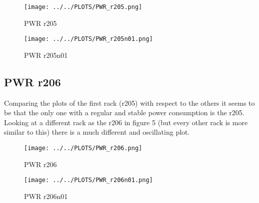 \vspace{-5pt}

\begin{figure}[H]
\centering
\texttt{[image: ../../PLOTS/PWR\_r205.png]}
\captionsetup{skip=-10pt}
\caption{PWR r205}
\label{fig:PWR_r205}
\end{figure}

\vspace{-5pt}

\begin{figure}[H]
\centering
\texttt{[image: ../../PLOTS/PWR\_r205n01.png]}
\captionsetup{skip=-10pt}
\caption{PWR r205n01}
\label{fig:PWR_r205n01}
\end{figure}
\clearpage

\subsection{PWR r206}
Comparing the plots of the first rack (r205) with respect to the others it seems to be that the only one with a regular and stable power consumption is the r205.\\ Looking at a different rack as the r206 in figure 5 (but every other rack is more similar to this) there is a much different and oscillating plot. 

\vspace{-12pt}

\begin{figure}[H]
\centering
\texttt{[image: ../../PLOTS/PWR\_r206.png]}
\captionsetup{skip=-10pt}
\caption{PWR r206}
\label{fig:PWR_r206}
\end{figure}

\vspace{-20pt}

\begin{figure}[H]
\centering
\texttt{[image: ../../PLOTS/PWR\_r206n01.png]}
\captionsetup{skip=-10pt}
\caption{PWR r206n01}
\label{fig:PWR_r206n01}
\end{figure}

